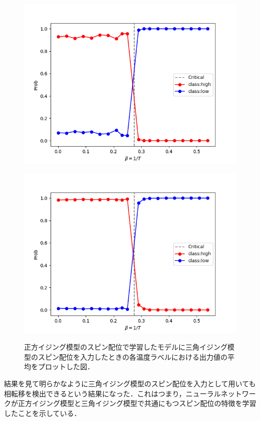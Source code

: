 \documentclass[a4paper,11pt]{jsreport}
\begin{document}
\begin{figure}[H]
  \begin{minipage}[b]{0.45\linewidth}
    \begin{center}
      \includegraphics[keepaspectratio, scale=0.4]{image/plot_square_FCN_tridata.png}
      \label{相分類器FCN結果tri}
    \end{center}
  \end{minipage}
  \begin{minipage}[b]{0.45\linewidth}
    \begin{center}
      \includegraphics[keepaspectratio, scale=0.4]{image/plot_square_CNN_tridata.png}
      \label{相分類器CNN結果tri}
    \end{center}
  \end{minipage}
  \caption{正方イジング模型のスピン配位で学習したモデルに三角イジング模型のスピン配位を入力したときの各温度ラベルにおける出力値の平均をプロットした図．}
\end{figure}
結果を見て明らかなように三角イジング模型のスピン配位を入力として用いても相転移を検出できるという結果になった．これはつまり，ニューラルネットワークが正方イジング模型と三角イジング模型で共通にもつスピン配位の特徴を学習したことを示している．
\end{document}
